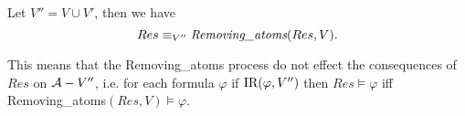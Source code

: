 \documentclass[letterpaper]{article} %
\begin{document}
\begin{proposition}\label{pro:remove}
Let $V''=V \cup V'$, then we have
 \[
   Res \equiv_{V''}  \emph{Removing\_atoms}(Res, V).
 \]
\end{proposition}
This means that the Removing\_atoms process do not effect the consequences of $Res$ on ${\cal A} - V''$, i.e. for each formula $\varphi$ if $\textrm{IR}(\varphi, V'')$ then $Res \models \varphi$ iff Removing\_atoms$(Res, V)\models \varphi$.





\end{document}
